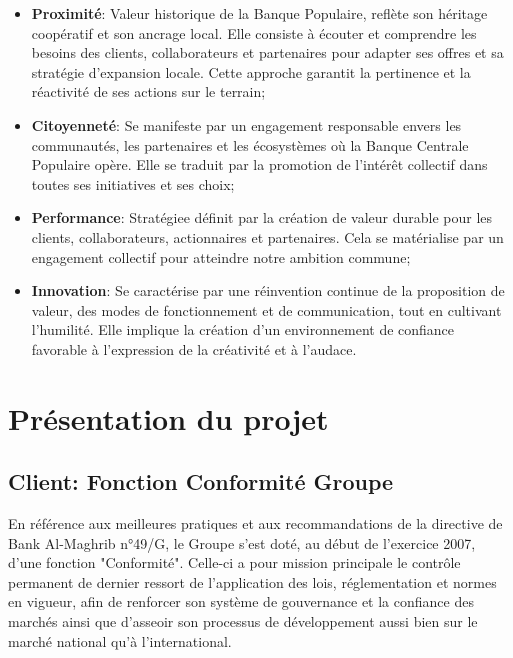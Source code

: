 \begin{itemize}
    \item \textbf{Proximité}: Valeur historique de la Banque Populaire, reflète son héritage coopératif et son ancrage local. Elle consiste à écouter et comprendre les besoins des clients, collaborateurs et partenaires pour adapter ses offres et sa stratégie d'expansion locale. Cette approche garantit la pertinence et la réactivité de ses actions sur le terrain;
    \item \textbf{Citoyenneté}: Se manifeste par un engagement responsable envers les communautés, les partenaires et les écosystèmes où la Banque Centrale Populaire opère. Elle se traduit par la promotion de l'intérêt collectif dans toutes ses initiatives et ses choix;
    \item \textbf{Performance}: Stratégiee définit par la création de valeur durable pour les clients, collaborateurs, actionnaires et partenaires. Cela se matérialise par un engagement collectif pour atteindre notre ambition commune;
    \item \textbf{Innovation}: Se caractérise par une réinvention continue de la proposition de valeur, des modes de fonctionnement et de communication, tout en cultivant l'humilité. Elle implique la création d'un environnement de confiance favorable à l'expression de la créativité et à l'audace.
\end{itemize}


\clearpage



\section{Présentation du projet}

\subsection{Client: Fonction Conformité Groupe}
En référence aux meilleures pratiques et aux recommandations de la directive de Bank Al-Maghrib n°49/G, le Groupe s'est doté, au début de l'exercice 2007, d'une fonction "Conformité". Celle-ci a pour mission principale le contrôle permanent de dernier ressort de l'application des lois, réglementation et normes en vigueur, afin de renforcer son système de gouvernance et la confiance des marchés ainsi que d'asseoir son processus de développement aussi bien sur le marché national qu'à l'international.\\

